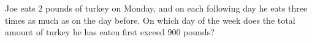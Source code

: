 Joe eats $2$ pounds of turkey on Monday, and on each following day he eats three times as much as on the day before. On which day of the week does the total amount of turkey he has eaten first exceed $900$ pounds?
